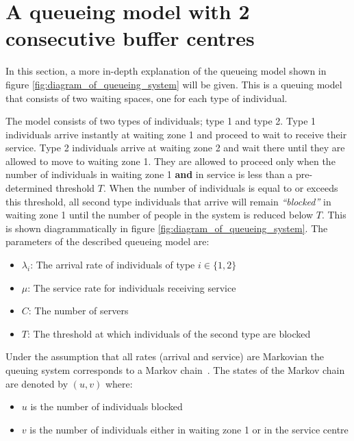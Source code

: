 \section{A queueing model with 2 consecutive buffer centres}

In this section, a more in-depth explanation of the queueing model shown in 
figure \ref{fig:diagram_of_queueing_system} will be given.
This is a queuing model that consists of two waiting spaces, one for each type
of individual.

The model consists of two types of individuals; type 1 and type 2.
Type 1 individuals arrive instantly at waiting zone 1 and proceed to wait to
receive their service. 
Type 2 individuals arrive at waiting zone 2 and wait there until they are 
allowed to move to waiting zone 1. 
They are allowed to proceed only when the number of 
individuals in waiting zone 1 \textbf{and} in service is less than a 
pre-determined threshold \(T\).
When the number of individuals is equal to or exceeds this threshold, all second type individuals that arrive will remain 
\textit{``blocked''} in waiting zone 1 until the number of people in the 
system is reduced below \(T\). 
This is shown diagrammatically in figure \ref{fig:diagram_of_queueing_system}.
The parameters of the described queueing model are:

\begin{itemize}
    \item \(\lambda_i\): The arrival rate of individuals of type \(i\in\{1, 2\}\)
    \item \(\mu\): The service rate for individuals receiving service
    \item \(C\): The number of servers
    \item \(T\): The threshold at which individuals of the second type are blocked
\end{itemize}

Under the assumption that all rates (arrival and service) are Markovian the
queuing system corresponds to a Markov chain~\cite{kemeny1976markov}.
The states of the Markov chain are denoted by \((u,v)\) where:

\begin{itemize}
    \item \(u\) is the number of individuals blocked
    \item \(v\) is the number of individuals either in waiting zone 1 or in the
    service centre
\end{itemize}


